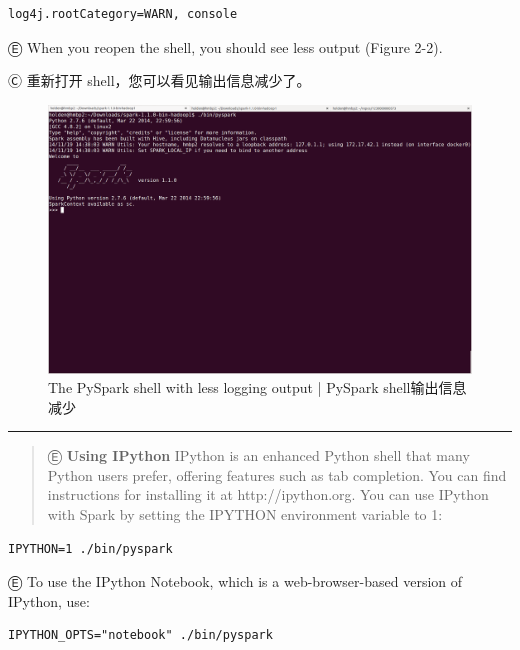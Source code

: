 \begin{lstlisting}
log4j.rootCategory=WARN, console
\end{lstlisting}

Ⓔ \textcolor{etc}{When you reopen the shell, you should see less output (Figure 2-2). }

Ⓒ 重新打开 shell，您可以看见输出信息减少了。

\begin{figure}[htbp]
\centering
\includegraphics[width=.99\textwidth]{../images/fig_2-2.png}
\caption{The PySpark shell with less logging output  |  PySpark shell输出信息减少}
\end{figure}


\begin{center}\rule{0.5\linewidth}{\linethickness}\end{center}

\begin{quote}
Ⓔ \textcolor{etc}{\textbf{Using IPython} IPython is an enhanced Python shell that many Python users prefer, offering features such as tab completion. You can
find instructions for installing it at http://ipython.org. You can use IPython with Spark by setting the IPYTHON environment variable to 1:}
\end{quote}

\begin{lstlisting}
IPYTHON=1 ./bin/pyspark
\end{lstlisting}

Ⓔ \textcolor{etc}{To use the IPython Notebook, which is a web-browser-based version of IPython, use:}

\begin{lstlisting}
IPYTHON_OPTS="notebook" ./bin/pyspark
\end{lstlisting}

